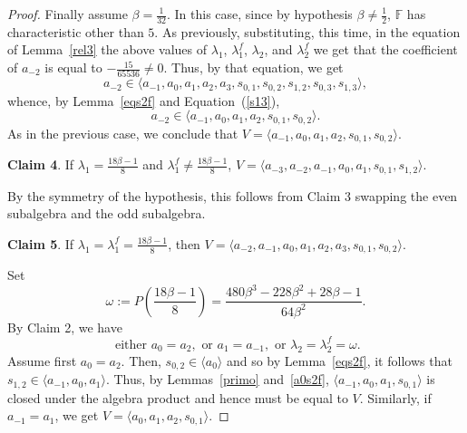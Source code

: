 \documentclass[a4paper]{amsart}
\newcommand{\F}{{\mathbb F}}
\newcommand{\lmu}{\lambda_1}
\newcommand{\lmf}{\lambda_1^f}
\newcommand{\lmd}{\lambda_2}
\newcommand{\lmdf}{\lambda_2^f}
\newcommand{\bt}{\beta}
\begin{document}
\begin{proof}
Finally assume $\bt=\frac{1}{32}$. In this case, since by hypothesis $\bt\neq \frac{1}{2}$, $\F$ has characteristic other than $5$. As previously, substituting, this time, in the equation of Lemma~\ref{rel3} the above values of $\lmu$, $\lmf$, $\lmd$, and $\lmdf$ we get that the coefficient of $a_{-2}$ is equal to  $-\frac{15}{65536}\neq 0$. Thus, by that equation, we get
$$ 
a_{-2}\in \langle  a_{-1}, a_0, a_1, a_2, a_3, s_{0,1}, s_{0,2}, s_{1,2}, s_{0,3}, s_{1,3} \rangle ,
$$ 
whence, by Lemma~\ref{eqs2f} and Equation~(\ref{s13}),
$$
a_{-2}\in \langle a_{-1}, a_0, a_1, a_2, s_{0,1}, s_{0,2} \rangle .
$$ 
As in the previous case, we conclude that $V=\langle a_{-1}, a_0, a_1, a_2, s_{0,1}, s_{0,2} \rangle$. 
\medskip

{\bf Claim 4}. {If $\lmu= \frac{18\bt-1}{8}$ and $\lmf\neq \frac{18\bt-1}{8}$, $V=\langle a_{-3}, a_{-2}, a_{-1}, a_0, a_1, s_{0,1}, s_{1,2} \rangle$.}
\medskip

By the symmetry of the hypothesis, this follows from Claim 3 swapping the even subalgebra and the odd subalgebra.
\medskip

{\bf Claim 5}. {If $\lmu=\lmf= \frac{18\bt-1}{8}$, then $V=\langle a_{-2}, a_{-1}, a_0, a_1, a_2, a_3, s_{0,1}, s_{0,2}\rangle$.}
\medskip

Set 
\begin{equation}\label{omega}
\omega:=P\left (\frac{18\bt-1}{8}\right )=\frac{480\bt^3-228\bt^2+28\bt-1}{64\bt^2}.
\end{equation}
By Claim 2, we have 
$$
\mbox{ either } a_0=a_2, \mbox{ or } a_1=a_{-1},\mbox{  or } \lmd=\lmdf=\omega .
$$
Assume first $a_0=a_2$. Then, $s_{0,2}\in \langle a_0\rangle$ and so
by Lemma~\ref{eqs2f}, it follows that  $s_{1,2}\in 
\langle a_{-1}, a_0, a_{1}\rangle$. Thus, by Lemmas~\ref{primo} and~\ref{a0s2f}, $\langle a_{-1}, a_0, a_{1}, s_{0,1}\rangle$ is closed under the algebra product and hence must be equal to $V$. Similarly, if $a_{-1}=a_1$, we get $V=\langle a_0, a_{1}, a_2, s_{0,1}\rangle$.  


\end{proof}
\end{document}
